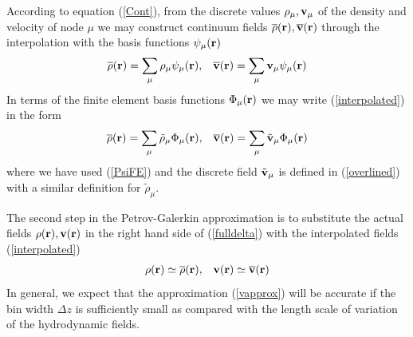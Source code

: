 \documentclass[b5paper,openright,10pt]{book}
\begin{document}
According  to equation  (\ref{Cont}), from  the discrete  values $\rho_\mu,
{\bf  v}_\mu$  of the  density  and  velocity  of  node $\mu$  we  may
construct  continuum  fields  $\overline{\rho}({\bf  r}),\overline{\bf
  v}({\bf  r})$ through  the  interpolation with  the basis  functions
$\psi_\mu({\bf r})$
\begin{align}
    \overline{\rho}({\bf r})=\sum_\mu{\rho}_\mu\psi_\mu({\bf r}), &&
\overline{\bf  v}({\bf r})=\sum_\mu{\bf v}_\mu \psi_\mu({\bf r})
\label{interpolated}
\end{align}
In terms of  the finite element basis functions $\Phi_\mu({\bf r})$ we may write
(\ref{interpolated})  in the form 
\begin{align}
    \overline{\rho}({\bf r})=\sum_\mu\tilde{\rho}_\mu\Phi_\mu({\bf r}), &&
\overline{\bf  v}({\bf r})= \sum_\mu\tilde{\bf v}_\mu\Phi_\mu({\bf r})
\label{interpolated2}
\end{align}
where  we  have  used  (\ref{PsiFE})   and  the   discrete  field
$\tilde{\bf  v}_\mu$ is  defined in  (\ref{overlined}) with  a similar
definition for $\tilde{\rho}_\mu$.

The second step in the  Petrov-Galerkin approximation is to substitute
the actual fields $\rho({\bf r}), {\bf  v}({\bf r})$ in the right hand
side    of   (\ref{fulldelta})    with    the   interpolated    fields
(\ref{interpolated})
\begin{align}
    {\rho}({\bf r})\simeq \overline{\rho}({\bf r}), &&
 {\bf v}({\bf r})\simeq \overline{\bf v}({\bf r})
\label{vapprox}
\end{align}
In general, we  expect that the approximation  (\ref{vapprox}) will be
accurate if the bin width $\Delta z$ is sufficiently small as compared
with  the  length  scale  of variation  of  the  hydrodynamic  fields.
\end{document}
